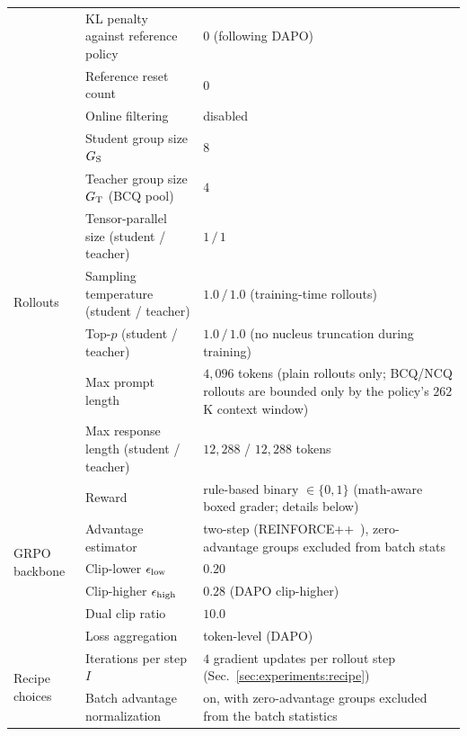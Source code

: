 \documentclass{llmxive}
\begin{document}
\begin{table}[!htbp]
{\begin{tabular}{lll}
            & KL penalty against reference policy         & $0$ (following DAPO) \\
            & Reference reset count                       & $0$ \\
            & Online filtering                            & disabled \\
        \midrule
        \multirow{7}{*}{Rollouts}
            & Student group size $G_{\rm S}$              & $8$ \\
            & Teacher group size $G_{\rm T}$ (BCQ pool)   & $4$ \\
            & Tensor-parallel size (student / teacher)    & $1\,/\,1$ \\
            & Sampling temperature (student / teacher)    & $1.0\,/\,1.0$ (training-time rollouts) \\
            & Top-$p$ (student / teacher)                 & $1.0\,/\,1.0$ (no nucleus truncation during training) \\
            & Max prompt length                           & $4{,}096$ tokens (plain rollouts only; BCQ/NCQ rollouts are bounded only by the policy's $262$K context window) \\
            & Max response length (student / teacher)     & $12{,}288$ / $12{,}288$ tokens \\
        \midrule
        \multirow{6}{*}{GRPO backbone}
            & Reward                                      & rule-based binary $\in\{0,1\}$ (math-aware boxed grader; details below) \\
            & Advantage estimator                         & two-step (REINFORCE++~\citep{hu2025reinforce++}), zero-advantage groups excluded from batch stats \\
            & Clip-lower $\epsilon_{\rm low}$             & $0.20$ \\
            & Clip-higher $\epsilon_{\rm high}$           & $0.28$ (DAPO clip-higher) \\
            & Dual clip ratio                             & $10.0$ \\
            & Loss aggregation                            & token-level (DAPO) \\
        \midrule
        \multirow{2}{*}{Recipe choices}
            & Iterations per step $I$                     & $4$ gradient updates per rollout step (Sec.~\ref{sec:experiments:recipe}) \\
            & Batch advantage normalization               & on, with zero-advantage groups excluded from the batch statistics \\

\end{tabular}}
\end{table}
\end{document}
